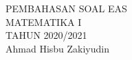 \documentclass{article}
\begin{document}
 \begin{titlepage}
    \vspace*{\fill}
    \begin{center}
      \Huge {PEMBAHASAN SOAL EAS \\ MATEMATIKA I \\ TAHUN 2020/2021}\\[0.4 cm]
      \huge {Ahmad Hisbu Zakiyudin}
    \end{center}
    \vspace*{\fill}
  \end{titlepage}
\makeatletter
\renewcommand*\env@matrix[1][*\c@MaxMatrixCols c]{%
  \hskip -\arraycolsep
  \let\@ifnextchar\new@ifnextchar
  \array{#1}}
\makeatother
\newcount\arrowcount
\newcommand\arrows[1]{
        \global\arrowcount#1
        \ifnum\arrowcount>0
                \begin{matrix}[c]
                \expandafter\nextarrow
        \fi
}

\newcommand\nextarrow[1]{
        \global\advance\arrowcount-1
        \ifx\relax#1\relax\else \xrightarrow{#1}\fi
        \ifnum\arrowcount=0
                \end{matrix}
        \else
                \\
                \expandafter\nextarrow
        \fi
}
\newpage
{}
\end{document}
